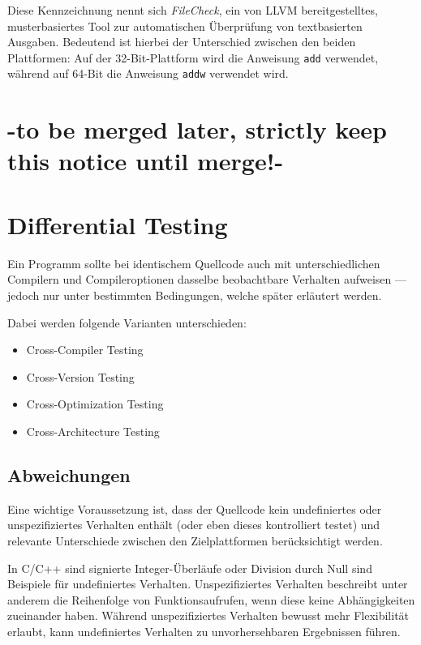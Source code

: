 \documentclass[a4paper,11pt]{article}
\begin{document}
Diese Kennzeichnung nennt sich \emph{FileCheck}, ein von LLVM bereitgestelltes, musterbasiertes Tool zur automatischen Überprüfung von textbasierten Ausgaben. \parencite{llvm_filecheck} Bedeutend ist hierbei der Unterschied zwischen den beiden Plattformen: Auf der 32-Bit-Plattform wird die Anweisung \texttt{add} verwendet, während auf 64-Bit die Anweisung \texttt{addw} verwendet wird. 



\section{-to be merged later, strictly keep this notice until merge!-}

\section{Differential Testing}

Ein Programm sollte bei identischem Quellcode auch mit unterschiedlichen Compilern
und Compileroptionen dasselbe beobachtbare Verhalten aufweisen — jedoch nur unter bestimmten Bedingungen, welche später erläutert werden.

Dabei werden folgende Varianten unterschieden:

\begin{itemize}
  \item Cross-Compiler Testing \parencite{terres2025}
  \item Cross-Version Testing \parencite{terres2025}
  \item Cross-Optimization Testing \parencite{terres2025}
  \item Cross-Architecture Testing \parencite{elnaggar2025}
\end{itemize}

\subsection{Abweichungen}

Eine wichtige Voraussetzung ist, dass der Quellcode kein undefiniertes oder unspezifiziertes Verhalten enthält (oder eben dieses kontrolliert testet) und relevante Unterschiede zwischen den Zielplattformen berücksichtigt werden.

In C/C++ sind signierte Integer-Überläufe oder Division durch Null \parencite{cppreference_arithmetic} sind Beispiele für undefiniertes Verhalten. Unspezifiziertes Verhalten beschreibt unter anderem die Reihenfolge von Funktionsaufrufen, wenn diese keine Abhängigkeiten zueinander haben. \parencite{cppreference_evaluation_order} Während unspezifiziertes Verhalten bewusst mehr Flexibilität erlaubt, kann undefiniertes Verhalten zu unvorhersehbaren Ergebnissen führen. \parencite{cppreference_undefined_behavior}
\end{document}
